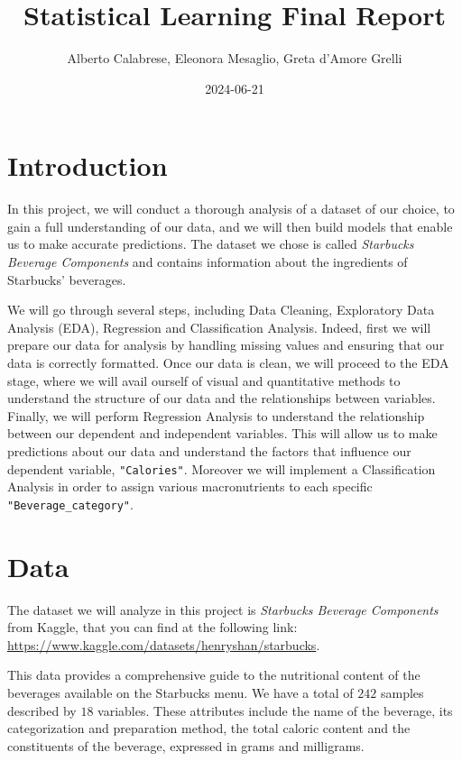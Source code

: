 \documentclass[
]{article}
\title{Statistical Learning Final Report}
\author{Alberto Calabrese, Eleonora Mesaglio, Greta d'Amore Grelli}
\date{2024-06-21}
\begin{document}
\maketitle

{
\setcounter{tocdepth}{3}
\tableofcontents
}
\section{Introduction}\label{introduction}

In this project, we will conduct a thorough analysis of a dataset of our
choice, to gain a full understanding of our data, and we will then build
models that enable us to make accurate predictions. The dataset we chose
is called \emph{Starbucks Beverage Components} and contains information
about the ingredients of Starbucks' beverages.

We will go through several steps, including Data Cleaning, Exploratory
Data Analysis (EDA), Regression and Classification Analysis. Indeed,
first we will prepare our data for analysis by handling missing values
and ensuring that our data is correctly formatted. Once our data is
clean, we will proceed to the EDA stage, where we will avail ourself of
visual and quantitative methods to understand the structure of our data
and the relationships between variables. Finally, we will perform
Regression Analysis to understand the relationship between our dependent
and independent variables. This will allow us to make predictions about
our data and understand the factors that influence our dependent
variable, \texttt{"Calories"}. Moreover we will implement a
Classification Analysis in order to assign various macronutrients to
each specific \texttt{"Beverage\_category"}.

\section{Data}\label{data}

The dataset we will analyze in this project is \emph{Starbucks Beverage
Components} from Kaggle, that you can find at the following link:
\url{https://www.kaggle.com/datasets/henryshan/starbucks}.

This data provides a comprehensive guide to the nutritional content of
the beverages available on the Starbucks menu. We have a total of
\(242\) samples described by \(18\) variables. These attributes include
the name of the beverage, its categorization and preparation method, the
total caloric content and the constituents of the beverage, expressed in
grams and milligrams.
\end{document}
